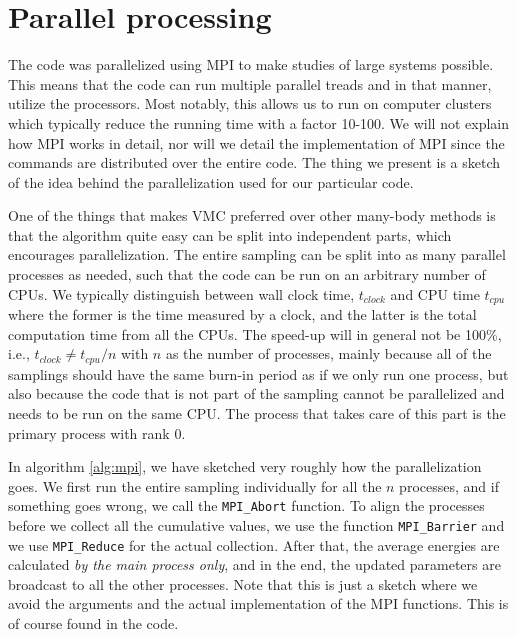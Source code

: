 \section{Parallel processing}
The code was parallelized using MPI to make studies of large systems possible. This means that the code can run multiple parallel treads and in that manner, utilize the processors. Most notably, this allows us to run on computer clusters which typically reduce the running time with a factor 10-100. We will not explain how MPI works in detail, nor will we detail the implementation of MPI since the commands are distributed over the entire code. The thing we present is a sketch of the idea behind the parallelization used for our particular code.

One of the things that makes VMC preferred over other many-body methods is that the algorithm quite easy can be split into independent parts, which encourages parallelization. The entire sampling can be split into as many parallel processes as needed, such that the code can be run on an arbitrary number of CPUs. We typically distinguish between wall clock time, $t_{clock}$ and CPU time $t_{cpu}$ where the former is the time measured by a clock, and the latter is the total computation time from all the CPUs. The speed-up will in general not be 100\%, i.e., $t_{clock}\neq t_{cpu}/n$ with $n$ as the number of processes, mainly because all of the samplings should have the same burn-in period as if we only run one process, but also because the code that is not part of the sampling cannot be parallelized and needs to be run on the same CPU. The process that takes care of this part is the primary process with rank 0.

In algorithm \ref{alg:mpi}, we have sketched very roughly how the parallelization goes. We first run the entire sampling individually for all the $n$ processes, and if something goes wrong, we call the \lstinline|MPI_Abort| function. To align the processes before we collect all the cumulative values, we use the function \lstinline|MPI_Barrier| and we use \lstinline|MPI_Reduce| for the actual collection. After that, the average energies are calculated \textit{by the main process only}, and in the end, the updated parameters are broadcast to all the other processes. Note that this is just a sketch where we avoid the arguments and the actual implementation of the MPI functions. This is of course found in the code.

